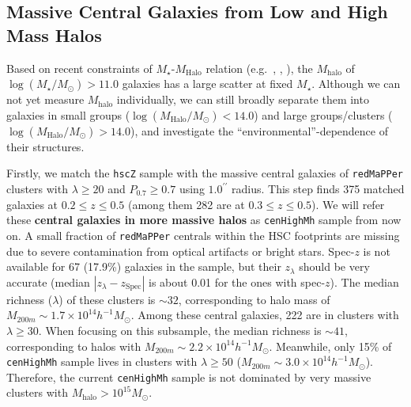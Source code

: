 \documentclass{emulateapj}
\def\arcsec{{\prime\prime}}
\def\redm{\texttt{redMaPPer}}
\def\rbcg{\texttt{cenHighMh}}
\def\mstar{{$M_{\star}$}}
\def\mhalo{{$M_{\mathrm{halo}}$}}
\def\logms{{$\log (M_{\star}/M_{\odot})$}}
\def\logmh{{$\log (M_{\mathrm{Halo}}/M_{\odot})$}}
\begin{document}
\begin{CJK*}{UTF8}{gbsn}
\subsection{Massive Central Galaxies from Low and High Mass Halos}
    \label{ssec:mass_central}
    
    Based on recent constraints of $M_{\star}$-$M_{\mathrm{Halo}}$ relation 
    (e.g.\ \citealt{Leauthaud2012}, \citealt{Behroozi2013}, \citealt{Kravtsov2014}), 
    the \mhalo{} of \logms{}$ > 11.0$ galaxies has a large scatter at fixed \mstar{}.            
    Although we can not yet measure \mhalo{} individually, we can still broadly 
    separate them into galaxies in small groups (\logmh{}$<14.0$) and 
    large groups/clusters (\logmh{}$>14.0$), and investigate the 
    ``environmental''-dependence of their structures. 
    
    Firstly, we match the \texttt{hscZ} sample with the massive central galaxies of 
    \redm{} clusters with $\lambda \geq 20$ and $P_{\mathrm{0.7}} \geq 0.7$ using 
    $1.0^{\arcsec}$ radius. 
    This step finds 375 matched galaxies at $0.2 \leq z \leq 0.5$ 
    (among them 282 are at $0.3 \leq z \leq 0.5$).  
    We will refer these \textbf{central galaxies in more massive halos} as \rbcg{} 
    sample from now on.
    A small fraction of \redm{} centrals within the HSC footprints are missing  
    due to severe contamination from optical artifacts or bright stars.
    Spec-$z$ is not available for 67 (17.9\%) galaxies in the sample, but their 
    $z_{\lambda}$ should be very accurate (median $|z_{\lambda} - z_{\mathrm{Spec}}|$ is 
    about 0.01 for the ones with spec-$z$).
    The median richness ($\lambda$) of these clusters is $\sim 32$, corresponding to 
    halo mass of $M_{200m}\sim 1.7\times 10^{14} h^{-1} M_{\odot}$. 
    Among these central galaxies, 222 are in clusters with $\lambda \geq 30$. 
    When focusing on this subsample, the median richness is $\sim 41$, corresponding 
    to halos with $M_{200m} \sim 2.2\times 10^{14} h^{-1} M_{\odot}$. 
    Meanwhile, only 15\% of \rbcg{} sample lives in clusters with $\lambda \geq 50$
    ($M_{200m} \sim 3.0\times 10^{14} h^{-1} M_{\odot}$).   
    Therefore, the current \rbcg{} sample is not dominated by very massive clusters 
    with \mhalo{}$>10^{15} M_{\odot}$.  
    

\end{CJK*}
\end{document}
